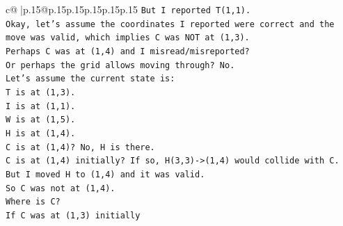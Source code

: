 \documentclass{article}
\begin{document}
{\begin{supertabular}{c@{$\;$}|p{.15\linewidth}@{}p{.15\linewidth}p{.15\linewidth}p{.15\linewidth}p{.15\linewidth}p{.15\linewidth}}
{{{\texttt{But I reported T(1,1).} \\
\texttt{Okay, let's assume the coordinates I reported were correct and the move was valid, which implies C was NOT at (1,3).} \\
\texttt{Perhaps C was at (1,4) and I misread/misreported?} \\
\texttt{Or perhaps the grid allows moving through? No.} \\
\texttt{Let's assume the current state is:} \\
\texttt{T is at (1,3).} \\
\texttt{I is at (1,1).} \\
\texttt{W is at (1,5).} \\
\texttt{H is at (1,4).} \\
\texttt{C is at (1,4)? No, H is there.} \\
\texttt{C is at (1,4) initially? If so, H(3,3){-}>(1,4) would collide with C.} \\
\texttt{But I moved H to (1,4) and it was valid.} \\
\texttt{So C was not at (1,4).} \\
\texttt{Where is C?} \\
\texttt{If C was at (1,3) initially} \\
            }
        }
    }
     \\ \\


\end{supertabular}}
\end{document}
